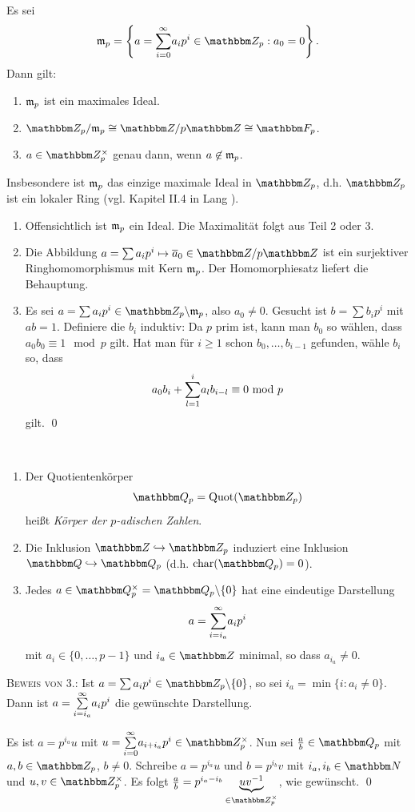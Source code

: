 \documentclass[a4paper, 12pt, twoside]{article}
\begin{document}
\BEM Es sei
\[
\mm_p = \left\{
a=\SUM{\infty}{i=0} a_i p^i \in \ZZ_p : a_0=0
\right\}.
\]
Dann gilt:
\begin{enumerate}
\item $\mathfrak{m}_p$ ist ein maximales Ideal.
\item $\ZZ_p/\mm_p \cong \ZZ/p\ZZ \cong \FF_p$.
\item $a\in \ZZ_p^\times$ genau dann, wenn $a\not\in\mathfrak{m}_p$.
\end{enumerate}
Insbesondere ist $\mathfrak{m}_p$ das einzige maximale Ideal in $\ZZ_p$,
d.h. $\ZZ_p$ ist ein lokaler Ring (vgl. Kapitel II.4 in 
Lang \cite{lang}).

\bew \begin{enumerate}
\item Offensichtlich ist $\mathfrak{m}_p$ ein Ideal. Die Maximalität
folgt aus Teil 2 oder 3.
\item Die Abbildung $a=\sum a_i p^i \mapsto \bar{a}_0\in \ZZ/p\ZZ$
ist ein surjektiver Ringhomomorphismus mit Kern $\mathfrak{m}_p$.
Der Homomorphiesatz liefert die Behauptung.
\item Es sei $a=\sum a_i p^i \in \ZZ_p\backslash \mm_p$, also
$a_0\neq 0$. Gesucht ist $b=\sum b_i p^i$ mit $ab=1$.
Definiere die $b_i$ induktiv: Da $p$ prim ist, kann man $b_0$ so 
wählen, dass $a_0 b_0 \equiv 1 \mod p$ gilt.
Hat man für $i\geq 1$ schon $b_0,\ldots,b_{i-1}$ gefunden, wähle
$b_i$ so, dass
\[
a_0 b_i + \overset{i}{\underset{l=1}{\mathop{\sum}}} a_l b_{i-l} \equiv 0 \ \mathrm{mod}\  p
\]
gilt.
\qed
\end{enumerate}

\DB\
\begin{enumerate}
\item Der Quotientenkörper
\[
\QQ_p = \mathrm{Quot}(\ZZ_p)
\]
heißt \emph{Körper der $p$-adischen Zahlen}.
\item Die Inklusion $\ZZ\hookrightarrow \ZZ_p$ induziert eine
Inklusion $\QQ\hookrightarrow \QQ_p$ (d.h. $\Char(\QQ_p)=0$).
\item Jedes $a\in \QQ_p^\times=\QQ_p\backslash\{0\}$ hat eine
eindeutige Darstellung
\[
a=\overset{\infty}{\underset{i=i_a}{\mathop{\sum}}} a_i p^i
\]
mit $a_i\in\{0,\ldots,p-1\}$ und $i_a\in\ZZ$ minimal, so dass
$a_{i_a}\neq 0$.
\end{enumerate}
\textsc{Beweis von 3.:} Ist $a=\sum a_i p^i\in\ZZ_p\backslash\{0\}$,
so sei $i_a=\min\{i:a_i\neq 0\}$.
Dann ist $a=\overset{\infty}{\underset{i=i_a}{\mathop{\sum}}} a_i p^i$ die gewünschte Darstellung.

Es ist $a=p^{i_a} u$ mit $u=\SUM{\infty}{i=0}a_{i+i_a} p^i\in\ZZ_p^\times$.
Nun sei $\frac{a}{b}\in\QQ_p$ mit $a,b\in\ZZ_p$, $b\neq 0$.
Schreibe $a=p^{i_a} u$ und $b=p^{i_b}v$ mit $i_a,i_b\in\NN$ und
$u,v\in\ZZ_p^\times$.
Es folgt
$\frac{a}{b}=p^{i_a-i_b} \ub{uv^{-1}}{\in\ZZ_p^\times}$,
wie gewünscht.
\qed
\end{document}
